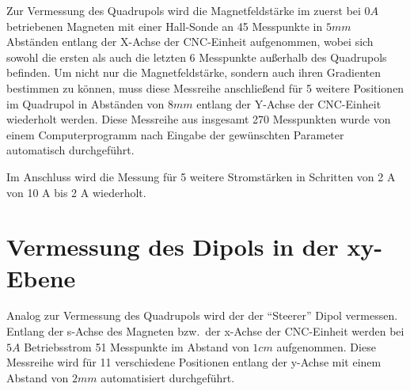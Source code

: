 \documentclass[bigchapter,colorback,accentcolor=tud4b,linedtoc,11pt]{tudreport}
\begin{document}
\begin{center}
\begin{figure}[H]
\end{figure}
\end{center}

Zur Vermessung des Quadrupols wird die Magnetfeldstärke im zuerst bei $0 A$ betriebenen Magneten mit einer Hall-Sonde an 45 Messpunkte in $5 mm$ Abständen entlang der X-Achse der CNC-Einheit aufgenommen, wobei sich sowohl die ersten als auch die letzten 6 Messpunkte außerhalb des Quadrupols befinden. Um nicht nur die Magnetfeldstärke, sondern auch ihren Gradienten bestimmen zu können, muss diese Messreihe anschließend für 5 weitere Positionen im Quadrupol in Abständen von $8mm$ entlang der Y-Achse der CNC-Einheit wiederholt werden. Diese Messreihe aus insgesamt 270 Messpunkten wurde von einem Computerprogramm nach Eingabe der gewünschten Parameter automatisch durchgeführt.

Im Anschluss wird die Messung für 5 weitere Stromstärken in Schritten von 2 A von 10 A bis 2 A wiederholt.

\section{Vermessung des Dipols in der xy-Ebene}
Analog zur Vermessung des Quadrupols wird der der "`Steerer"' Dipol vermessen. Entlang der s-Achse des Magneten bzw.\ der x-Achse der CNC-Einheit werden bei $5 A$ Betriebsstrom 51 Messpunkte im Abstand von $1 cm$ aufgenommen. Diese Messreihe wird für 11 verschiedene Positionen entlang der y-Achse mit einem Abstand von $2 mm$ automatisiert durchgeführt.
\end{document}

